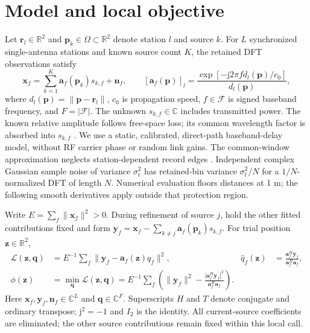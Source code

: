 \documentclass[a4paper,12pt,review]{cas-sc}
\newcommand{\R}{\mathbb R}
\newcommand{\C}{\mathbb C}
\begin{document}
\section{Model and local objective}
Let $\bm r_l\in\R^2$ and $\bm p_k\in\Omega\subset\R^2$ denote station $l$ and source $k$. For $L$ synchronized single-antenna stations and known source count $K$, the retained DFT observations satisfy
\begin{equation}
 \bm x_f=\sum_{k=1}^K\bm a_f(\bm p_k)s_{k,f}+\bm n_f,
 \qquad [\bm a_f(\bm p)]_l=\frac{\exp[-\mathrm j2\pi f d_l(\bm p)/c_0]}{d_l(\bm p)},
 \label{eq:model}
\end{equation}
where $d_l(\bm p)=\|\bm p-\bm r_l\|$, $c_0$ is propagation speed, $f\in\mathcal F$ is signed baseband frequency, and $F=|\mathcal F|$. The unknown $s_{k,f}\in\C$ includes transmitted power. The known relative amplitude follows free-space loss; its common wavelength factor is absorbed into $s_{k,f}$ \cite{ITURP5252024}. We use a static, calibrated, direct-path baseband-delay model, without RF carrier phase or random link gains. The common-window approximation neglects station-dependent record edges \cite{ChenHudsonYao2002}. Independent complex Gaussian sample noise of variance $\sigma_t^2$ has retained-bin variance $\sigma_t^2/N$ for a $1/N$-normalized DFT of length $N$. Numerical evaluation floors distances at 1 m; the following smooth derivatives apply outside that protection region.

Write $E=\sum_f\|\bm x_f\|^2>0$. During refinement of source $j$, hold the other fitted contributions fixed and form $\bm y_f=\bm x_f-\sum_{k\ne j}\bm a_f(\bm p_k)\widehat s_{k,f}$. For trial position $\bm z\in\R^2$,
\begin{align}
 \mathcal L(\bm z,\bm q)&=E^{-1}\sum_f\|\bm y_f-\bm a_f(\bm z)q_f\|^2,
 &\widehat q_f(\bm z)&=\frac{\bm a_f^H\bm y_f}{\bm a_f^H\bm a_f},\label{eq:ls}\\
 \phi(\bm z)&=\min_{\bm q}\mathcal L(\bm z,\bm q)
 =E^{-1}\sum_f\left(\|\bm y_f\|^2-\frac{|\bm a_f^H\bm y_f|^2}{\bm a_f^H\bm a_f}\right).
 \label{eq:profile}
\end{align}
Here $\bm x_f,\bm y_f,\bm n_f\in\C^L$ and $\bm q\in\C^F$. Superscripts $H$ and $T$ denote conjugate and ordinary transpose; $\mathrm j^2=-1$ and $I_2$ is the identity. All current-source coefficients are eliminated; the other source contributions remain fixed within this local call.
\end{document}
